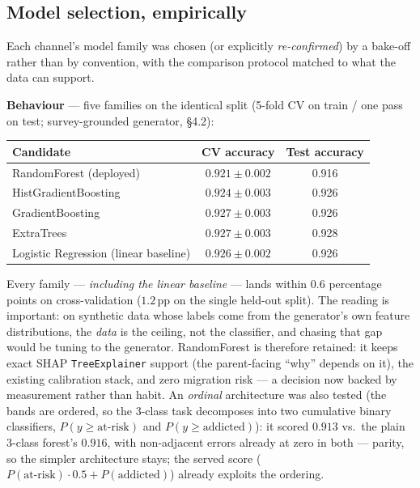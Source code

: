 \documentclass[11pt,a4paper]{article}
\begin{document}
\subsection{Model selection, empirically}
\label{sec:modelselection}
Each channel's model family was chosen (or explicitly \emph{re-confirmed}) by a
bake-off rather than by convention, with the comparison protocol matched to what the
data can support.

\textbf{Behaviour} --- five families on the identical split (5-fold CV on train /
one pass on test; survey-grounded generator, \S4.2):
\begin{center}
\begin{tabular}{lcc}
\toprule
\textbf{Candidate} & \textbf{CV accuracy} & \textbf{Test accuracy} \\
\midrule
RandomForest (deployed) & $0.921 \pm 0.002$ & 0.916 \\
HistGradientBoosting    & $0.924 \pm 0.003$ & 0.926 \\
GradientBoosting        & $0.927 \pm 0.003$ & 0.926 \\
ExtraTrees              & $0.927 \pm 0.003$ & 0.928 \\
Logistic Regression (linear baseline) & $0.926 \pm 0.002$ & 0.926 \\
\bottomrule
\end{tabular}
\end{center}
Every family --- \emph{including the linear baseline} --- lands within $0.6$
percentage points on cross-validation ($1.2$\,pp on the single held-out split). The
reading is important: on synthetic data whose labels come
from the generator's own feature distributions, the \emph{data} is the ceiling, not
the classifier, and chasing that gap would be tuning to the generator.
RandomForest is therefore retained: it keeps exact SHAP \texttt{TreeExplainer}
support (the parent-facing ``why'' depends on it), the existing calibration stack,
and zero migration risk --- a decision now backed by measurement rather than habit.
An \emph{ordinal} architecture was also tested (the bands are ordered, so the
3-class task decomposes into two cumulative binary classifiers,
$P(y{\geq}\text{at-risk})$ and $P(y{\geq}\text{addicted})$): it scored $0.913$
vs.\ the plain 3-class forest's $0.916$, with non-adjacent errors already at zero
in both --- parity, so the simpler architecture stays; the served score
($P(\text{at-risk})\cdot0.5 + P(\text{addicted})$) already exploits the ordering.
\end{document}
